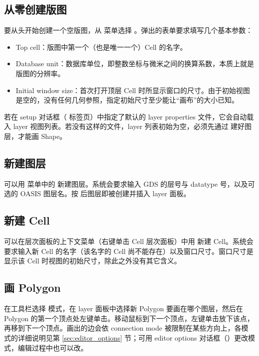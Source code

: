 \subsection{从零创建版图}\label{sec:create_from_scratch}

要从头开始创建一个空版图，从  菜单选择 。弹出的表单要求填写几个基本参数：

\begin{itemize}
\item Top cell：版图中第一个（也是唯一一个）Cell 的名字。
\item Database unit：数据库单位，即整数坐标与微米之间的换算系数，本质上就是版图的分辨率。
\item Initial window size：首次打开顶层 Cell 时所显示窗口的尺寸。由于初始视图是空的，没有任何几何参照，指定初始尺寸至少能让“画布”的大小已知。
\end{itemize}

若在 setup 对话框（ 标签页）中指定了默认的 layer properties 文件，它会自动载入 layer 视图列表。若没有这样的文件，layer 列表初始为空，必须先通过  建好图层，才能画 Shape。

\subsection{新建图层}\label{sec:create_layers}

可以用  菜单中的  新建图层。系统会要求输入 GDS 的层号与 datatype 号，以及可选的 OASIS 图层名。按  后图层即被创建并插入 layer 面板。

\subsection{新建 Cell}\label{sec:create_cells}

可以在层次面板的上下文菜单（右键单击 Cell 层次面板）中用  新建 Cell。系统会要求输入新 Cell 的名字（该名字的 Cell 尚不能存在）以及窗口尺寸。窗口尺寸是显示该 Cell 时视图的初始尺寸，除此之外没有其它含义。

\subsection{画 Polygon}\label{sec:create_polygon}

在工具栏选择  模式，在 layer 面板中选择新 Polygon 要画在哪个图层，然后在 Polygon 的第一个顶点处左键单击。移动鼠标到下一个顶点，左键单击放下该点，再移到下一个顶点。画出的边会依 connection mode 被限制在某些方向上，各模式的详细说明见第 \ref{sec:editor_options} 节；可用 editor options 对话框（）更改模式，编辑过程中也可以改。

